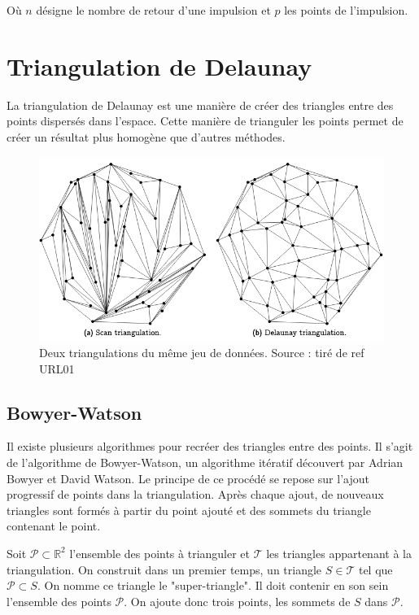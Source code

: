 Où $n$ désigne le nombre de retour d'une impulsion et $p$ les points de l'impulsion.


\section{Triangulation de Delaunay}
La triangulation de Delaunay est une manière de créer des triangles entre des points dispersés dans l’espace.
Cette manière de trianguler les points permet de créer un résultat plus homogène que d’autres méthodes.

\begin{figure}[htb!]
    \centering
    \includegraphics[width=0.8\linewidth]{figures/triangulation-example.png}
    \caption{Deux triangulations du même jeu de données. Source : tiré de ref URL01}
    \label{fig:triangulation_example}
\end{figure}

\subsection{Bowyer-Watson}
Il existe plusieurs algorithmes pour recréer des triangles entre des points.
Il s’agit de l’algorithme de Bowyer-Watson, un algorithme itératif découvert par Adrian Bowyer et David Watson.
Le principe de ce procédé se repose sur l’ajout progressif de points dans la triangulation.
Après chaque ajout, de nouveaux triangles sont formés à partir du point ajouté et des sommets du triangle contenant le point.

Soit $\mathcal{P} \subset \mathbb{R}^2$ l'ensemble des points à trianguler et $\mathcal{T}$ les triangles appartenant à la triangulation. On construit dans un premier temps, un triangle $S \in \mathcal{T}$ tel que $\mathcal{P} \subset S$. On nomme ce triangle le "super-triangle". Il doit contenir en son sein l'ensemble des points $\mathcal{P}$. On ajoute donc trois points, les sommets de $S$ dans $\mathcal{P}$.

